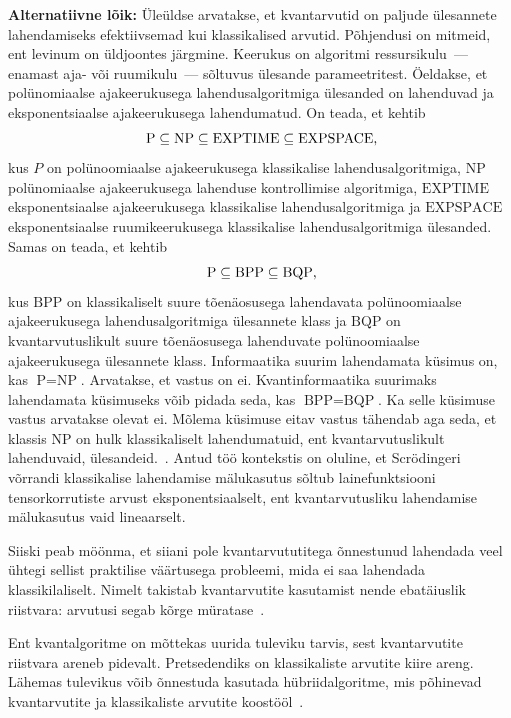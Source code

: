 \documentclass[12pt]{report}
\begin{document}
{\bf Alternatiivne lõik:}
Üleüldse arvatakse, et kvantarvutid on paljude ülesannete lahendamiseks efektiivsemad kui klassikalised arvutid.
Põhjendusi on mitmeid, ent levinum on üldjoontes järgmine.
Keerukus on algoritmi ressursikulu~--- enamast aja- või ruumikulu~--- sõltuvus ülesande parameetritest.
Öeldakse, et polünomiaalse ajakeerukusega lahendusalgoritmiga ülesanded on lahenduvad ja eksponentsiaalse ajakeerukusega lahendumatud.
On teada, et kehtib
\[
  \text{P}\subseteq\text{NP}\subseteq\text{EXPTIME}\subseteq\text{EXPSPACE}\rlap,
\]
kus \(P\) on polünoomiaalse ajakeerukusega klassikalise lahendusalgoritmiga, \(\text{NP}\) polünomiaalse ajakeerukusega lahenduse kontrollimise algoritmiga, \(\text{EXPTIME}\) eksponentsiaalse ajakeerukusega klassikalise lahendusalgoritmiga ja \(\text{EXPSPACE}\) eksponentsiaalse ruumikeerukusega klassikalise lahendusalgoritmiga ülesanded.
Samas on teada, et kehtib
\[
  \text{P}\subseteq\text{BPP}\subseteq\text{BQP}\rlap,
\]
kus \(\text{BPP}\) on klassikaliselt suure tõenäosusega lahendavata polünoomiaalse ajakeerukusega lahendusalgoritmiga ülesannete klass ja \(\text{BQP}\) on kvantarvutuslikult suure tõenäosusega lahenduvate polünoomiaalse ajakeerukusega ülesannete klass.
Informaatika suurim lahendamata küsimus on, kas \(\text{P}=\text{NP}\).
Arvatakse, et vastus on ei.
Kvantinformaatika suurimaks lahendamata küsimuseks võib pidada seda, kas \(\text{BPP}=\text{BQP}\).
Ka selle küsimuse vastus arvatakse olevat ei.
Mõlema küsimuse eitav vastus tähendab aga seda, et klassis \(\text{NP}\) on hulk klassikaliselt lahendumatuid, ent kvantarvutuslikult lahenduvaid, ülesandeid.~\cite{stanford, nielsen+chuang}.
Antud töö kontekstis on oluline, et Scrödingeri võrrandi klassikalise lahendamise mälukasutus sõltub lainefunktsiooni tensorkorrutiste arvust eksponentsiaalselt, ent kvantarvutusliku lahendamise mälukasutus vaid lineaarselt.~\cite{whitfield+etal2011, mcardle+etal, cao+etal, kassal+etal}

Siiski peab möönma, et siiani pole kvantarvututitega õnnestunud lahendada veel ühtegi sellist praktilise väärtusega probleemi, mida ei saa lahendada klassikilaliselt.
Nimelt takistab kvantarvutite kasutamist nende ebatäiuslik riistvara: arvutusi segab kõrge müratase~\cite{whitfield+etal2022}.

Ent kvantalgoritme on mõttekas uurida tuleviku tarvis, sest kvantarvutite riistvara areneb pidevalt.
Pretsedendiks on klassikaliste arvutite kiire areng.
Lähemas tulevikus võib õnnestuda kasutada hübriidalgoritme, mis põhinevad kvantarvutite ja klassikaliste arvutite koostööl~\cite{omalley+etal}.
\end{document}
